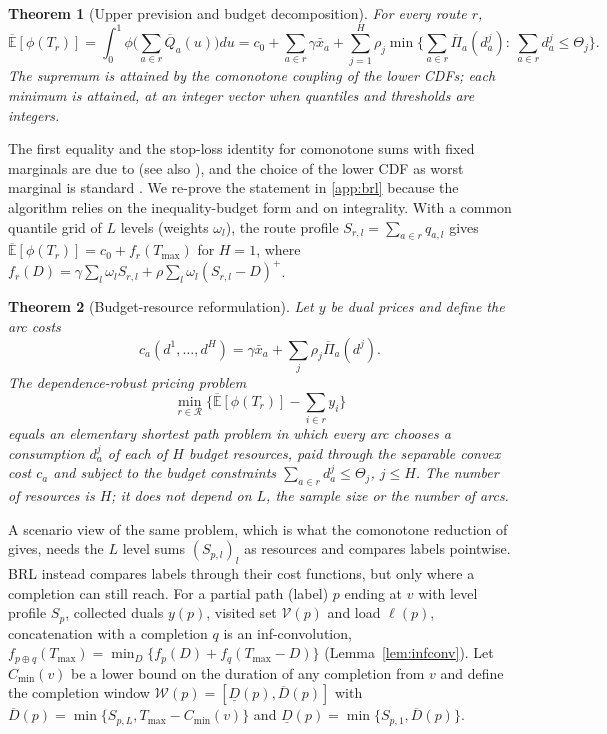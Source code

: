 \documentclass[preprint,12pt]{elsarticle}
\newtheorem{theorem}{Theorem}
\theoremstyle{definition}
\theoremstyle{remark}
\newcommand{\cR}{\mathcal{R}}
\newcommand{\Eu}{\overline{\mathbb{E}}}
\newcommand{\Qb}{\overline{Q}}
\newcommand{\Pib}{\overline{\Pi}}
\newcommand{\xb}{\bar x}
\newcommand{\pos}[1]{\left(#1\right)^{+}}
\newcommand{\Dl}{\underline{D}}
\newcommand{\Dh}{\overline{D}}
\begin{document}
\begin{theorem}[Upper prevision and budget decomposition]\label{thm:brl-main}
For every route $r$,
\[
\Eu[\phi(T_r)]=\int_0^1\phi\Big(\sum_{a\in r}\Qb_a(u)\Big)du
=c_0+\sum_{a\in r}\gamma\xb_a+\sum_{j=1}^{H}\rho_j\min\Big\{\sum_{a\in r}\Pib_a(d^j_a):\ \sum_{a\in r}d^j_a\le\Theta_j\Big\}.
\]
The supremum is attained by the comonotone coupling of the lower CDFs; each minimum is attained, at an integer vector when quantiles and thresholds are integers.
\end{theorem}

The first equality and the stop-loss identity for comonotone sums with fixed marginals are due to \citet{Meilijson1979} (see also \citealp{Kaas2000,Dhaene2002}), and the choice of the lower CDF as worst marginal is standard \citep{Williamson1990}. We re-prove the statement in \ref{app:brl} because the algorithm relies on the inequality-budget form and on integrality. With a common quantile grid of $L$ levels (weights $\omega_l$), the route profile $S_{r,l}=\sum_{a\in r}q_{a,l}$ gives $\Eu[\phi(T_r)]=c_0+f_r(T_{\max})$ for $H=1$, where $f_r(D)=\gamma\sum_l\omega_lS_{r,l}+\rho\sum_l\omega_l\pos{S_{r,l}-D}$.

\begin{theorem}[Budget-resource reformulation]\label{thm:resource}
Let $y$ be dual prices and define the arc costs \[c_a(d^1,\dots,d^H)=\gamma\xb_a+\sum_j\rho_j\Pib_a(d^j).\] The dependence-robust pricing problem \[\min_{r\in\cR}\Big\{\Eu[\phi(T_r)]-\sum_{i\in r}y_i\Big\}\] equals an elementary shortest path problem in which every arc chooses a consumption $d^j_a$ of each of $H$ budget resources, paid through the separable convex cost $c_a$ and subject to the budget constraints $\sum_{a\in r}d^j_a\le\Theta_j$, $j\le H$. The number of resources is $H$; it does not depend on $L$, the sample size or the number of arcs.
\end{theorem}

A scenario view of the same problem, which is what the comonotone reduction of \citet{GhosalHoWiesemann2024} gives, needs the $L$ level sums $(S_{p,l})_l$ as resources and compares labels pointwise. BRL instead compares labels through their cost functions, but only where a completion can still reach. For a partial path (label) $p$ ending at $v$ with level profile $S_p$, collected duals $y(p)$, visited set $\mathcal V(p)$ and load $\ell(p)$, concatenation with a completion $q$ is an inf-convolution, $f_{p\oplus q}(T_{\max})=\min_D\{f_p(D)+f_q(T_{\max}-D)\}$ (Lemma~\ref{lem:infconv}). Let $C_{\min}(v)$ be a lower bound on the duration of any completion from $v$ and define the completion window $\mathcal W(p)=[\Dl(p),\Dh(p)]$ with $\Dh(p)=\min\{S_{p,L},T_{\max}-C_{\min}(v)\}$ and $\Dl(p)=\min\{S_{p,1},\Dh(p)\}$.
\end{document}
